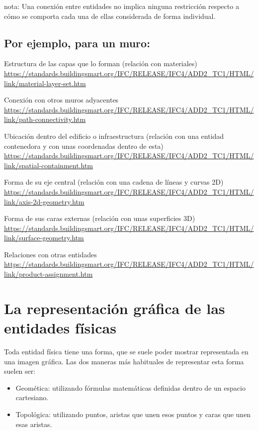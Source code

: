 \documentclass[spanish,12pt,a4paper,final,oneside]{book}
\begin{document}
nota: Una conexión entre entidades no implica ninguna restricción respecto a cómo se comporta cada una de ellas considerada de forma individual.



\subsection{Por ejemplo, para un muro:}
Estructura de las capas que lo forman (relación con materiales)
 \\ \url{https://standards.buildingsmart.org/IFC/RELEASE/IFC4/ADD2_TC1/HTML/link/material-layer-set.htm}

Conexión con otros muros adyacentes
\\ \url{https://standards.buildingsmart.org/IFC/RELEASE/IFC4/ADD2_TC1/HTML/link/path-connectivity.htm}

Ubicación dentro del edificio o infraestructura (relación con una entidad contenedora y con unas coordenadas dentro de esta)
\\ \url{https://standards.buildingsmart.org/IFC/RELEASE/IFC4/ADD2_TC1/HTML/link/spatial-containment.htm}

Forma de su eje central (relación con una cadena de líneas y curvas 2D)
\\ \url{https://standards.buildingsmart.org/IFC/RELEASE/IFC4/ADD2_TC1/HTML/link/axis-2d-geometry.htm}

Forma de sus caras externas (relación con unas superficies 3D)
\\ \url{https://standards.buildingsmart.org/IFC/RELEASE/IFC4/ADD2_TC1/HTML/link/surface-geometry.htm}

Relaciones con otras entidades
\\ \url{https://standards.buildingsmart.org/IFC/RELEASE/IFC4/ADD2_TC1/HTML/link/product-assignment.htm}


\section{La \textbf{representación gráfica} de las entidades físicas}

Toda entidad física tiene una forma, que se suele poder mostrar representada en una imagen gráfica. Las dos maneras más habituales de representar esta forma suelen ser:
\begin{itemize}
\item Geomética: utilizando fórmulas matemáticas definidas dentro de un espacio cartesiano.
\item Topológica: utilizando puntos, aristas que unen esos puntos y caras que unen esas aristas.
\end{itemize}
\end{document}
